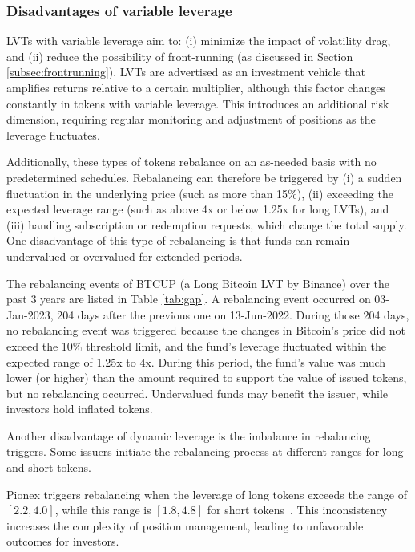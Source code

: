\subsubsection{Disadvantages of variable leverage}
LVTs with variable leverage aim to: (i) minimize the impact of volatility drag, and (ii) reduce the possibility of front-running (as discussed in Section \ref{subsec:frontrunning}). LVTs are advertised as an investment vehicle that amplifies returns relative to a certain multiplier, although this factor changes constantly in tokens with variable leverage. This introduces an additional risk dimension, requiring regular monitoring and adjustment of positions as the leverage fluctuates. 

Additionally, these types of tokens rebalance on an as-needed basis with no predetermined schedules. Rebalancing can therefore be triggered by (i) a sudden fluctuation in the underlying price (such as more than 15\%), (ii) exceeding the expected leverage range (such as above 4x or below 1.25x for long LVTs), and (iii) handling subscription or redemption requests, which change the total supply. One disadvantage of this type of rebalancing is that funds can remain undervalued or overvalued for extended periods.


\begin{example}
	The rebalancing events of BTCUP (a Long Bitcoin LVT by Binance) over the past 3 years are listed in Table \ref{tab:gap}. A rebalancing event occurred on 03-Jan-2023, 204 days after the previous one on 13-Jun-2022. During those 204 days, no rebalancing event was triggered because the changes in Bitcoin’s price did not exceed the 10\% threshold limit, and the fund’s leverage fluctuated within the expected range of 1.25x to 4x. During this period, the fund’s value was much lower (or higher) than the amount required to support the value of issued tokens, but no rebalancing occurred. Undervalued funds may benefit the issuer, while investors hold inflated tokens.
\end{example}

Another disadvantage of dynamic leverage is the imbalance in rebalancing triggers. Some issuers initiate the rebalancing process at different ranges for long and short tokens.
\begin{example}
	Pionex triggers rebalancing when the leverage of long tokens exceeds the range of $\left[2.2, 4.0\right]$, while this range is $\left[1.8, 4.8\right]$ for short tokens~\cite{Pionex}. This inconsistency increases the complexity of position management, leading to unfavorable outcomes for investors.
\end{example}

